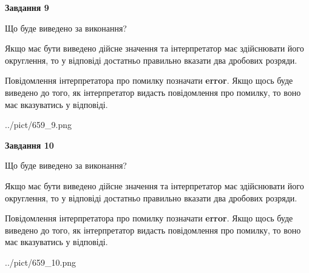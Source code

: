 \documentclass[12pt, ukrainian]{article}
\begin{document}
{\begin {Large}
{\begin {center}\textbf{Завдання 9}\end {center}}\par
Що буде виведено за виконання? \par

Якщо має бути виведено дійсне значення та інтерпретатор має здійснювати його округлення, 
то у відповіді достатньо правильно вказати два дробових розряди.

Повідомлення інтерпретатора про помилку позначати \textbf{error}.
Якщо щось буде виведено до того, як інтерпретатор видасть повідомлення про помилку, 
то воно має вказуватись у відповіді. \par

\begin{center}
	{../pict/659_9.png}
\end{center}
\newpage

{\begin {center}\textbf{Завдання 10}\end {center}}\par
Що буде виведено за виконання? \par

Якщо має бути виведено дійсне значення та інтерпретатор має здійснювати його округлення, 
то у відповіді достатньо правильно вказати два дробових розряди.

Повідомлення інтерпретатора про помилку позначати \textbf{error}.
Якщо щось буде виведено до того, як інтерпретатор видасть повідомлення про помилку, 
то воно має вказуватись у відповіді. \par

\begin{center}
	{../pict/659_10.png}
\end{center}
\newpage

\end {Large}}
\end{document}
